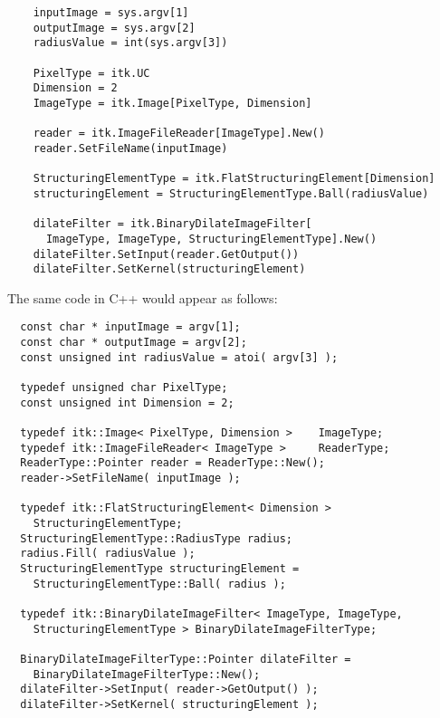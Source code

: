 \small
\begin{verbatim}
    inputImage = sys.argv[1]
    outputImage = sys.argv[2]
    radiusValue = int(sys.argv[3])

    PixelType = itk.UC
    Dimension = 2
    ImageType = itk.Image[PixelType, Dimension]

    reader = itk.ImageFileReader[ImageType].New()
    reader.SetFileName(inputImage)

    StructuringElementType = itk.FlatStructuringElement[Dimension]
    structuringElement = StructuringElementType.Ball(radiusValue)

    dilateFilter = itk.BinaryDilateImageFilter[
      ImageType, ImageType, StructuringElementType].New()
    dilateFilter.SetInput(reader.GetOutput())
    dilateFilter.SetKernel(structuringElement)
\end{verbatim}
\normalsize
The same code in C++ would appear as follows:

\small
\begin{verbatim}
  const char * inputImage = argv[1];
  const char * outputImage = argv[2];
  const unsigned int radiusValue = atoi( argv[3] );

  typedef unsigned char PixelType;
  const unsigned int Dimension = 2;

  typedef itk::Image< PixelType, Dimension >    ImageType;
  typedef itk::ImageFileReader< ImageType >     ReaderType;
  ReaderType::Pointer reader = ReaderType::New();
  reader->SetFileName( inputImage );

  typedef itk::FlatStructuringElement< Dimension >
    StructuringElementType;
  StructuringElementType::RadiusType radius;
  radius.Fill( radiusValue );
  StructuringElementType structuringElement =
    StructuringElementType::Ball( radius );

  typedef itk::BinaryDilateImageFilter< ImageType, ImageType,
    StructuringElementType > BinaryDilateImageFilterType;

  BinaryDilateImageFilterType::Pointer dilateFilter =
    BinaryDilateImageFilterType::New();
  dilateFilter->SetInput( reader->GetOutput() );
  dilateFilter->SetKernel( structuringElement );
\end{verbatim}
\normalsize

